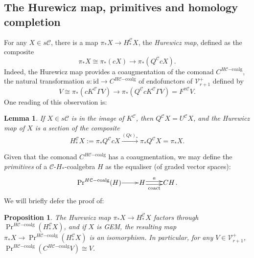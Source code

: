 \documentclass[11pt]{amsart} \renewcommand{\baselinestretch}{1.2}
\theoremstyle{plain}
\newtheorem{lem}[thm]{Lemma}
\newtheorem{prop}[thm]{Proposition}
\theoremstyle{definition}
\DeclareMathOperator{\Prim}{Pr}
\renewcommand{\to}{\longrightarrow}
\newcommand{\calV}{\mathcal{V}}
\newcommand{\calc}{\mathcal{C}}
\newcommand{\vect}[2]{\calV^{#1}_{#2}}
\newcommand{\PA}[1]{\pi#1}
\newcommand{\HC}[1]{H#1\mathrm{-coalg}}
\newcommand{\Id}{\mathrm{id}}
\begin{document}
\begin{Pi-algebras and cohomology algebras}
\subsection{The Hurewicz map, primitives and homology completion}\label{The Hurewicz map, primitives and homology completion}
For any $X\in s\calc$, there is a map $\pi_*X\to H_*^{\calc}X$, the \emph{Hurewicz map}, defined as the composite
\[\pi_*X\cong \pi_*(cX)\to \pi_*(Q^{\calc}cX).\]
Indeed, the Hurewicz map provides a coaugmentation of the comonad $C^{\HC{\calc}}$, the natural transformation $a:\Id\to C^{\HC{\calc}}$ of endofunctors of $\vect{+}{r+1}$ defined by
\[V\cong \pi_*(cK^{\calc}\Gamma  V)\to \pi_*(Q^{\calc}cK^{\calc}\Gamma  V)=F^{\PA{\calc}}V.\]
One reading of this observation is:
\begin{lem}
\label{hurewicz is a section}
If $X\in s\calc$ is in the image of $K^\calc$, then $Q^\calc X=U^{\calc}X$, and the Hurewicz map of $X$ is a section of the composite
\[H_*^{\calc}X:=\pi_*Q^{\calc}cX\overset{(Q\epsilon)_*}{\to}\pi_*Q^{\calc}X=\pi_*X.\]
\end{lem}
Given that the comonad $C^{\HC{\calc}}$ has a coaugmentation, we may define the \emph{primitives} of a $\calc$-$H_*$-coalgebra $H$ as the equaliser (of graded vector spaces):
\[\xymatrix@R=4mm@1{
\Prim^{\HC{\calc}}(H)\ar[r]
&%
H\ar@<.5ex>[r]^-{a}
\ar@<-.5ex>[r]_-{\textup{coact}}
&%
CH%
}.\]
We will briefly defer the proof of:
\begin{prop}
\label{hurewicz}
The Hurewicz map $\pi_*X\to H_*^{\calc}X$ factors through $\Prim^{\HC{\calc}}(H_*^{\calc}X)$, and if $X$ is GEM, the resulting map $\pi_*X\to\Prim^{\HC{\calc}}(H_*^\calc X)$ is an isomorphism. In particular, for any $V\in\vect{+}{r+1}$, $\Prim^{\HC{\calc}}(C^{\HC{\calc}}V)\cong V$.
\end{prop}


\end{Pi-algebras and cohomology algebras}
\end{document}
